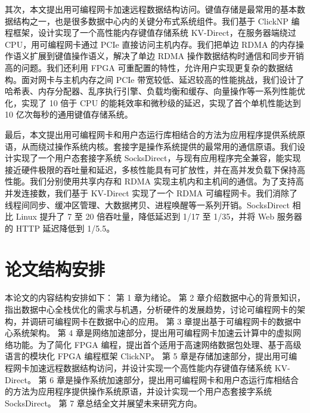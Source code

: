 其次，本文提出用可编程网卡加速远程数据结构访问。键值存储是最常用的基本数据结构之一，也是很多数据中心内的关键分布式系统组件。我们基于 ClickNP 编程框架，设计实现了一个高性能内存键值存储系统 KV-Direct，在服务器端绕过 CPU，用可编程网卡通过 PCIe 直接访问主机内存。我们把单边 RDMA 的内存操作语义扩展到键值操作语义，解决了单边 RDMA 操作数据结构时通信和同步开销高的问题。我们还利用 FPGA 可重配置的特性，允许用户实现更复杂的数据结构。面对网卡与主机内存之间 PCIe 带宽较低、延迟较高的性能挑战，我们设计了哈希表、内存分配器、乱序执行引擎、负载均衡和缓存、向量操作等一系列性能优化，实现了 10 倍于 CPU 的能耗效率和微秒级的延迟，实现了首个单机性能达到 10 亿次每秒的通用键值存储系统。

最后，本文提出用可编程网卡和用户态运行库相结合的方法为应用程序提供系统原语，从而绕过操作系统内核。套接字是操作系统提供的最常用的通信原语。我们设计实现了一个用户态套接字系统 SocksDirect，与现有应用程序完全兼容，能实现接近硬件极限的吞吐量和延迟，多核性能具有可扩放性，并在高并发负载下保持高性能。我们分别使用共享内存和 RDMA 实现主机内和主机间的通信。为了支持高并发连接数，我们基于 KV-Direct 实现了一个 RDMA 可编程网卡。我们消除了线程间同步、缓冲区管理、大数据拷贝、进程唤醒等一系列开销。SocksDirect 相比 Linux 提升了 7 至 20 倍吞吐量，降低延迟到 1/17 至 1/35，并将 Web 服务器的 HTTP 延迟降低到 1/5.5。


\section{论文结构安排}

本论文的内容结构安排如下：
第 1 章为绪论。
第 2 章介绍数据中心的背景知识，指出数据中心全栈优化的需求与机遇，分析硬件的发展趋势，讨论可编程网卡的架构，并调研可编程网卡在数据中心的应用。
第 3 章提出基于可编程网卡的数据中心系统架构。
第 4 章是网络加速部分，提出用可编程网卡加速云计算中的虚拟网络功能。为了简化 FPGA 编程，提出首个适用于高速网络数据包处理、基于高级语言的模块化 FPGA 编程框架 ClickNP。
第 5 章是存储加速部分，提出用可编程网卡加速远程数据结构访问，并设计实现一个高性能内存键值存储系统 KV-Direct。
第 6 章是操作系统加速部分，提出用可编程网卡和用户态运行库相结合的方法为应用程序提供操作系统原语，并设计实现一个用户态套接字系统 SocksDirect。
第 7 章总结全文并展望未来研究方向。